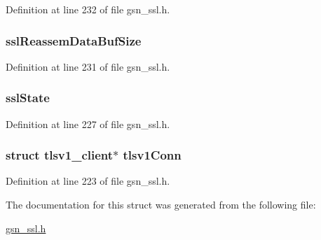 Definition at line 232 of file gsn\_\-ssl.h.

\hypertarget{a00243_a74c1a364bfc6690c798543c316088c1b}{
\subsubsection[{sslReassemDataBufSize}]{ {\bf sslReassemDataBufSize}}}
\label{a00243_a74c1a364bfc6690c798543c316088c1b}


Definition at line 231 of file gsn\_\-ssl.h.

\hypertarget{a00243_a51862f5394c213c6b8ffaa502455d403}{
\subsubsection[{sslState}]{ {\bf sslState}}}
\label{a00243_a51862f5394c213c6b8ffaa502455d403}


Definition at line 227 of file gsn\_\-ssl.h.

\hypertarget{a00243_aaaedca82f634e4192220ccfcad7d066e}{
\subsubsection[{tlsv1Conn}]{\setlength{\rightskip}{0pt plus 5cm}struct tlsv1\_\-client$\ast$ {\bf tlsv1Conn}}}
\label{a00243_aaaedca82f634e4192220ccfcad7d066e}


Definition at line 223 of file gsn\_\-ssl.h.



The documentation for this struct was generated from the following file:\begin{DoxyCompactItemize}
\item 
\hyperlink{a00590}{gsn\_\-ssl.h}\end{DoxyCompactItemize}
